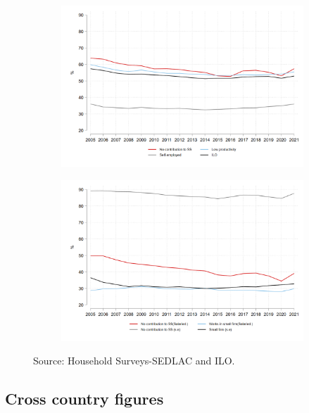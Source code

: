 \documentclass[english]{article}
\begin{document}
\begin{itemize}
\begin{figure}[!htb]
\justifying
  \caption{Evolution of alternative informality related measures}
\begin{subfigure}{.5\textwidth}
  \centering
  \includegraphics[width=1\linewidth]{latex/figures/Series/LAC_ipo_fig1.png}
  \label{fig:sub1}
\end{subfigure}%
\begin{subfigure}{.5\textwidth}
  \centering
  \includegraphics[width=1\linewidth]{latex/figures/Series/LAC_ipo_fig2.png}
  \label{fig:sub2}
\end{subfigure}
\label{fig:test}
\footnotesize{Source: Household Surveys-SEDLAC and ILO.}

\end{figure}


\subsection{Cross country figures}

\end{itemize}
\end{document}
